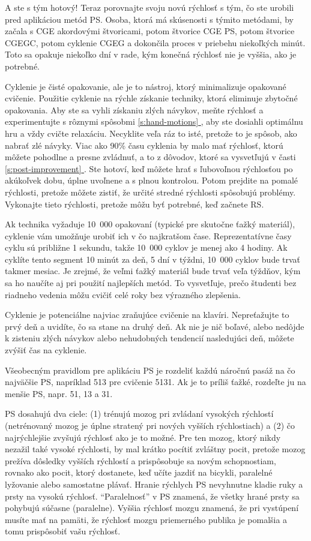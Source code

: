 \documentclass[11pt,a4paper]{book}
\newcommand*{\fullref}[1]{\hyperref[{#1}]{\ref*{#1} \nameref*{#1}}} %
\begin{document}
A ste s tým hotový! Teraz porovnajte svoju novú rýchlosť s tým, čo ste urobili pred aplikáciou metód PS. Osoba, ktorá má skúsenosti s týmito metódami, by začala s CGE akordovými štvoricami, potom štvorice CGE PS, potom štvorice CGEGC, potom cyklenie CGEG a dokončila proces v priebehu niekoľkých minút. Toto sa opakuje niekoľko dní v rade, kým konečná rýchlosť nie je vyššia, ako je potrebné.

Cyklenie je čisté opakovanie, ale je to nástroj, ktorý minimalizuje opakované cvičenie. Použitie cyklenie na rýchle získanie techniky, ktorá eliminuje zbytočné opakovania. Aby ste sa vyhli získaniu zlých návykov, meňte rýchlosť a experimentujte s rôznymi spôsobmi \fullref{s:hand-motions}, aby ste dosiahli optimálnu hru a vždy cvičte relaxáciu. Necyklite veľa ráz to isté, pretože to je spôsob, ako nabrať zlé návyky. Viac ako 90\% času cyklenia by malo mať rýchlosť, ktorú môžete pohodlne a presne zvládnuť, a to z dôvodov, ktoré sa vysvetľujú v časti \fullref{s:post-improvement}. Ste hotoví, keď môžete hrať s ľubovoľnou rýchlosťou po akúkoľvek dobu, úplne uvoľnene a s plnou kontrolou. Potom prejdite na pomalé rýchlosti, pretože môžete zistiť, že určité stredné rýchlosti spôsobujú problémy. Vykonajte tieto rýchlosti, pretože môžu byť potrebné, keď začnete RS.

Ak technika vyžaduje 10~000 opakovaní (typické pre skutočne ťažký materiál), cyklenie vám umožňuje urobiť ich v čo najkratšom čase. Reprezentatívne časy cyklu sú približne 1 sekundu, takže 10~000 cyklov je menej ako 4 hodiny. Ak cyklíte tento segment 10 minút za deň, 5 dní v týždni, 10~000 cyklov bude trvať takmer mesiac. Je zrejmé, že veľmi ťažký materiál bude trvať veľa týždňov, kým sa ho naučíte aj pri použití najlepších metód. To vysvetľuje, prečo študenti bez riadneho vedenia môžu cvičiť celé roky bez výrazného zlepšenia.

Cyklenie je potenciálne najviac zraňujúce cvičenie na klavíri. Nepreťažujte to
prvý deň a uvidíte, čo sa stane na druhý deň. Ak nie je nič boľavé, alebo nedôjde k zisteniu zlých návykov alebo nehudobných tendencií nasledujúci deň, môžete zvýšiť čas na cyklenie.

Všeobecným pravidlom pre aplikáciu PS je rozdeliť každú náročnú pasáž na čo najväčšie PS, napríklad 513 pre cvičenie 5131. Ak je to príliš ťažké, rozdeľte ju na menšie PS, napr. 51, 13 a 31.

PS dosahujú dva ciele: (1) trénujú mozog pri zvládaní vysokých rýchlostí (netrénovaný mozog je úplne stratený pri nových vyšších rýchlostiach) a (2) čo najrýchlejšie zvyšujú rýchlosť ako je to možné. Pre ten mozog, ktorý nikdy nezažil také vysoké rýchlosti, by mal krátko pocítiť zvláštny pocit, pretože mozog prežíva dôsledky vyšších rýchlostí a prispôsobuje sa novým schopnostiam, rovnako ako pocit, ktorý dostanete, keď učíte jazdiť na bicykli, paralelné lyžovanie alebo samostatne plávať. Hranie rýchlych PS nevyhnutne kladie ruky a prsty na vysokú rýchlosť. “Paralelnosť” v PS znamená, že všetky hrané prsty sa pohybujú súčasne (paralelne). Vyššia rýchlosť mozgu znamená, že pri vystúpení musíte mať na pamäti, že rýchlosť mozgu priemerného publika je pomalšia a tomu prispôsobiť vašu rýchlosť.
\end{document}
